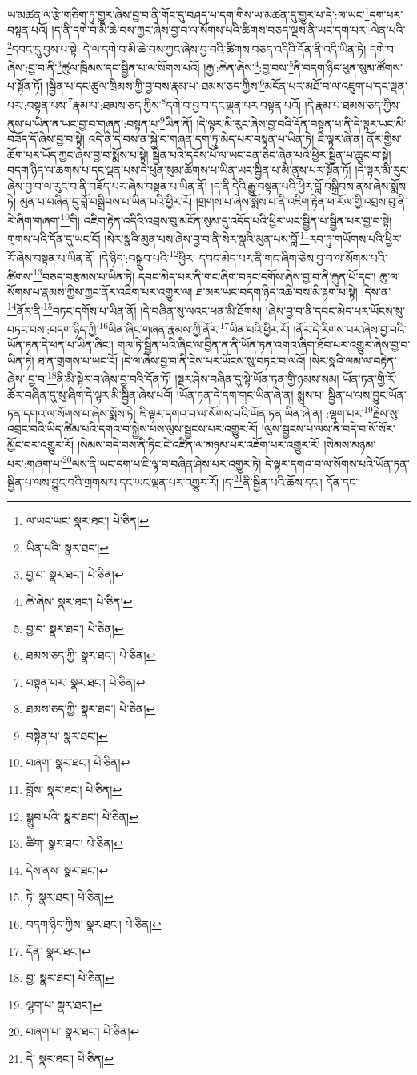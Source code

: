 ཡ་མཚན་ལ་རྩེ་གཅིག་ཏུ་གྱུར་ཞེས་བྱ་བ་ནི་གོང་དུ་བཤད་པ་དག་གིས་ཡ་མཚན་དུ་གྱུར་པ་དེ་:ལ་ཡང་\footnote{ལ་ཡང་ཡང་  སྣར་ཐང་།  པེ་ཅིན། }དག་པར་བསྟན་པའོ། །ད་ནི་དགེ་བ་མི་ཆེ་བས་ཀྱང་ཞེས་བྱ་བ་ལ་སོགས་པའི་ཚིགས་བཅད་ལྔས་ནི་ཡང་དག་པར་:ལེན་པའི་\footnote{ཡིན་པའི་  སྣར་ཐང་། }དབང་དུ་བྱས་པ་སྟེ། དེ་ལ་དགེ་བ་མི་ཆེ་བས་ཀྱང་ཞེས་བྱ་བའི་ཚིགས་བཅད་འདིའི་དོན་ནི་འདི་ཡིན་ཏེ། དགེ་བ་ཞེས་:བྱ་བ་ནི་\footnote{བྱ་བ་  སྣར་ཐང་།  པེ་ཅིན། }ཚུལ་ཁྲིམས་དང་སྦྱིན་པ་ལ་སོགས་པའོ། །རྒྱ་:ཆེན་ཞེས་\footnote{ཆེ་ཞེས་  སྣར་ཐང་།  པེ་ཅིན། }:བྱ་བས་\footnote{བྱ་བ་  སྣར་ཐང་།  པེ་ཅིན། }ནི་བདག་ཉིད་ཕུན་སུམ་ཚོགས་པ་སྟོན་ཏོ། །སྦྱིན་པ་དང་ཚུལ་ཁྲིམས་ཀྱི་བྱ་བས་རྣམ་པ་:ཐམས་ཅད་ཀྱིས་\footnote{ཐམས་ཅད་ཀྱི་  སྣར་ཐང་།  པེ་ཅིན། }མངོན་པར་མཐོ་བ་ལ་འཇུག་པ་དང་ལྡན་པར་:བསྟན་པས་\footnote{བསྟན་པར་  སྣར་ཐང་།  པེ་ཅིན། }རྣམ་པ་:ཐམས་ཅད་ཀྱིས་\footnote{ཐམས་ཅད་ཀྱི་  སྣར་ཐང་།  པེ་ཅིན། }དགེ་བ་བྱ་བ་དང་ལྡན་པར་བསྟན་པའོ། །དེ་རྣམ་པ་ཐམས་ཅད་ཀྱིས་ནུས་པ་ཡིན་ན་ཡང་བྱ་བ་གཞན་:བསྟན་པ་\footnote{བསྟེན་པ་  སྣར་ཐང་། }ཡིན་ནོ། །དེ་ལྟར་མི་རུང་ཞེས་བྱ་བའི་དོན་བསྟན་པ་ནི་དེ་ལྟར་ཡང་མི་བཟོད་དོ་ཞེས་བྱ་བ་སྟེ། འདི་ནི་དེ་བས་ན་སྐྱེ་བ་གཞན་དག་ཏུ་མེད་པར་བསྟན་པ་ཡིན་ཏེ། ཇི་ལྟར་ཞེ་ན། ནོར་གྱིས་ཆོག་པར་ཡོད་ཀྱང་ཞེས་བྱ་བ་སྨོས་པ་སྟེ། སྦྱིན་པའི་དངོས་པོ་ལ་ཡང་ངན་ཅིང་ཞེན་པའི་ཕྱིར་སྦྱིན་པ་ཆུང་བ་སྟེ། བདག་ཉིད་ལ་ཆགས་པ་དང་ལྡན་པས་དེ་ཕུན་སུམ་ཚོགས་པ་ཡིན་ཡང་སྦྱིན་པ་མི་ནུས་པར་སྟོན་ཏོ། །དེ་ལྟར་མི་རུང་ཞེས་བྱ་བ་ལ་རུང་བ་ནི་བཟོད་པར་ཞེས་བསྟན་པ་ཡིན་ནོ། །ད་ནི་དེའི་རྒྱུ་བསྟན་པའི་ཕྱིར་བློ་བསྒྲིབས་ནས་ཞེས་སྨོས་ཏེ། མུན་པ་བཞིན་དུ་བློ་བསྒྲིབས་པ་ཡིན་པའི་ཕྱིར་རོ། །གྲགས་པ་ཞེས་སྨོས་པ་ནི་འཇིག་རྟེན་ཕ་རོལ་གྱི་འབྲས་བུ་ནི་རེ་ཞིག་གཞག་\footnote{བཞག་  སྣར་ཐང་།  པེ་ཅིན། }གི། འཇིག་རྟེན་འདིའི་འབྲས་བུ་མངོན་སུམ་དུ་འདོད་པའི་ཕྱིར་ཡང་སྦྱིན་པ་སྦྱིན་པར་བྱ་བ་སྟེ། གྲགས་པའི་དོན་དུ་ཡང་ངོ། །སེར་སྣའི་མུན་པས་ཞེས་བྱ་བ་ནི་སེར་སྣའི་མུན་པས་བློ་\footnote{བློས་  སྣར་ཐང་།  པེ་ཅིན། }རབ་ཏུ་གཡོགས་པའི་ཕྱིར་རོ་ཞེས་བསྟན་པ་ཡིན་ནོ། །དེ་ཉིད་:བསྒྲུབ་པའི་\footnote{སྒྲུབ་པའི་  སྣར་ཐང་།  པེ་ཅིན། }ཕྱིར། དབང་མེད་པར་ནི་གང་ཞིག་ཅེས་བྱ་བ་ལ་སོགས་པའི་ཚིགས་\footnote{ཚིག་  སྣར་ཐང་།  པེ་ཅིན། }བཅད་བརྩམས་པ་ཡིན་ཏེ། དབང་མེད་པར་ནི་གང་ཞིག་བཏང་དགོས་ཞེས་བྱ་བ་ནི་རྐུན་པོ་དང་། ཆུ་ལ་སོགས་པ་རྣམས་ཀྱིས་ཀྱང་ནོར་འཇིག་པར་འགྱུར་ལ། ཐ་མར་ཡང་བདག་ཉིད་འཆི་བས་མི་རྟག་པ་སྟེ། :དེས་ན་\footnote{དེས་ནས་  སྣར་ཐང་། }ནོར་ནི་\footnote{ཏེ་  སྣར་ཐང་།  པེ་ཅིན། }བཏང་དགོས་པ་ཡིན་ནོ། །དེ་བཞིན་སུ་ལའང་ཕན་མི་ཐོགས། །ཞེས་བྱ་བ་ནི་དབང་མེད་པར་ཡོངས་སུ་བཏང་བས་:བདག་ཉིད་ཀྱི་\footnote{བདག་ཉིད་ཀྱིས་  སྣར་ཐང་།  པེ་ཅིན། }ཡིན་ཞིང་གཞན་རྣམས་ཀྱི་ནོར་\footnote{དོན་  སྣར་ཐང་། }ཡིན་པའི་ཕྱིར་རོ། །ནོར་དེ་རིགས་པར་ཞེས་བྱ་བའི་ཡོན་ཏན་དེ་ཕན་པ་ཡིན་ཞིང་། གལ་ཏེ་སྦྱིན་པའི་ཞིང་ལ་བྱིན་ན་ནི་ཡོན་ཏན་འགའ་ཞིག་ཐོབ་པར་འགྱུར་ཞེས་བྱ་བ་ཡིན་ཏེ། ཐ་ན་གྲགས་པ་ཡང་ངོ། །དེ་ལ་ཞེས་བྱ་བ་ནི་ངེས་པར་ཡོངས་སུ་བཏང་བ་ལའོ། །སེར་སྣའི་ལམ་ལ་བརྟེན་ཞེས་:བྱ་བ་\footnote{བྱ་  སྣར་ཐང་།  པེ་ཅིན། }ནི་མི་སྟེར་བ་ཞེས་བྱ་བའི་དོན་ཏོ། །སྔར་ཤེས་བཞིན་དུ་སྟེ་ཡོན་ཏན་གྱི་ཉམས་སམ། ཡོན་ཏན་གྱི་རོ་ཚོར་བཞིན་དུ་སུ་ཞིག་དེ་ལྟར་མི་སྦྱིན་ཞེས་པའོ། །ཡོན་ཏན་དེ་དག་གང་ཡིན་ཞེ་ན། སྨྲས་པ། སྦྱིན་པ་ལས་བྱུང་ཡོན་ཏན་དགའ་ལ་སོགས་པ་ཞེས་སྨོས་ཏེ། ཇི་ལྟར་དགའ་བ་ལ་སོགས་པའི་ཡོན་ཏན་ཡིན་ཞེ་ན། :ལྷག་པར་\footnote{ལྷག་པ་  སྣར་ཐང་། }རྗེས་སུ་འབྲང་བའི་ཡིད་ཚིམ་པའི་དགའ་བ་སྐྱེས་པས་ལུས་སྦྱངས་པར་འགྱུར་རོ། །ལུས་སྦྱངས་པ་ལས་ནི་བདེ་བ་སོ་སོར་མྱོང་བར་འགྱུར་རོ། །སེམས་བདེ་བས་ནི་ཏིང་ངེ་འཛིན་ལ་མཉམ་པར་འཇོག་པར་འགྱུར་རོ། །སེམས་མཉམ་པར་:གཞག་པ་\footnote{བཞག་པ་  སྣར་ཐང་།  པེ་ཅིན། }ལས་ནི་ཡང་དག་པ་ཇི་ལྟ་བ་བཞིན་ཤེས་པར་འགྱུར་ཏེ། དེ་ལྟར་དགའ་བ་ལ་སོགས་པའི་ཡོན་ཏན་སྦྱིན་པ་ལས་བྱུང་བའི་གྲགས་པ་དང་ཡང་ལྡན་པར་འགྱུར་རོ། །ད་\footnote{དེ་  སྣར་ཐང་།  པེ་ཅིན། }ནི་སྦྱིན་པའི་ཆོས་དང་། དོན་དང་། 